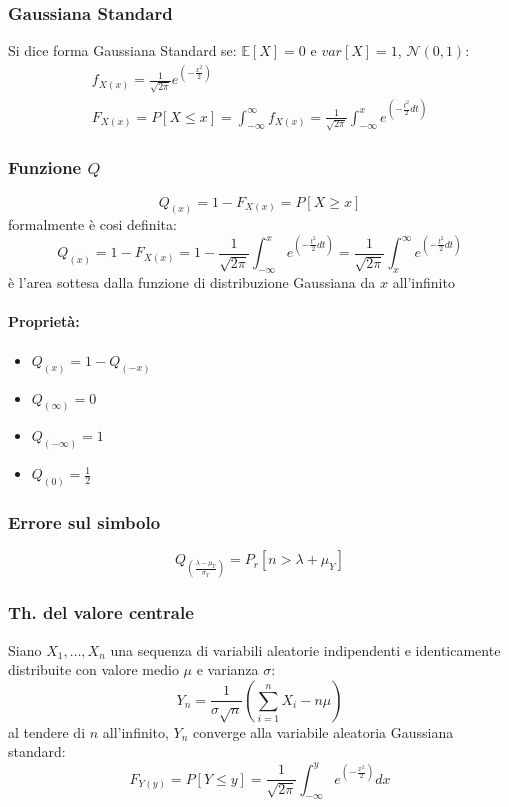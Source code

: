         \subsubsection{Gaussiana Standard}
            Si dice forma Gaussiana Standard se: $\mathbb{E}[X] = 0$ e $var[X] = 1$, $\mathcal{N}(0,1)$:
            \begin{gather}
                f_{X(x)} = \frac{1}{\sqrt{2\pi}} e^{\displaystyle\left(-\frac{x^2}{2}\right)}\nonumber \\
                F_{X(x)} =P[X\leq x] = \int_{-\infty}^{\infty}f_{X(x)} =\frac{1}{\sqrt{2\pi}} \int_{-\infty}^{x}e^{\displaystyle\left(-\frac{t^2}{2}dt\right)}\nonumber 
            \end{gather}
        \subsubsection{Funzione $Q$}
            \[
                Q_{(x)} = 1-F_{X(x)} = P[X\geq x]  
            \]
            formalmente è cosi definita:
            \[
                Q_{(x)} = 1-F_{X(x)} = 1 - \frac{1}{\sqrt{2\pi}} \int_{-\infty}^{x}e^{\left(-\frac{t^2}{2}dt\right)} = \frac{1}{\sqrt{2\pi}} \int_{x}^{\infty}e^{\left(-\frac{t^2}{2}dt\right)}  
            \]
            è l'area sottesa dalla funzione di distribuzione Gaussiana da $x$ all'infinito
            \paragraph{Proprietà:}
            \begin{itemize}
                \item {$Q_{(x)} = 1-Q_{(-x)}$
                }
                \item {$Q_{(\infty)} = 0$}
                \item {$Q_{(-\infty)} = 1$}
                \item {$Q_{(0)} = \frac{1}{2}$}
            \end{itemize}
            \subsubsection{Errore sul simbolo}
                \[
                    Q_{\displaystyle\left(\frac{\lambda -\mu_Y}{\sigma_Y}\right)} = P_r[n>\lambda + \mu_Y]
                \]
        \subsubsection{Th. del valore centrale}
            Siano $X_1,\dots,X_n$ una sequenza di variabili aleatorie indipendenti e identicamente distribuite con valore medio $\mu$ e varianza $\sigma$:
            \[
                Y_n = \frac{1}{\sigma\sqrt{n}}\left(\sum_{i=1}^{n}X_i-n\mu\right)    
            \]
            al tendere di $n$ all'infinito, $Y_n$ converge alla variabile aleatoria Gaussiana standard:
            \[
                F_{Y(y)} =P[Y\leq y] = \frac{1}{\sqrt{2\pi}} \int_{-\infty}^{y}e^{\left(-\frac{x^2}{2}\right)}dx    
            \]
